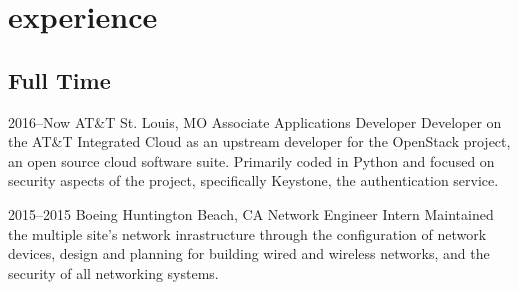 \documentclass[]{friggeri-cv} %
\begin{document}
 
 



 





\section{experience}
 
\subsection{Full Time}

\begin{entrylist}


\entry 
{2016--Now}
{AT\&T}
{St. Louis, MO}%
{Associate Applications Developer}
{
Developer on the AT\&T Integrated Cloud as an upstream developer for the OpenStack project, an open source cloud software suite. Primarily coded in Python and focused on security aspects of the project, specifically Keystone, the authentication service.
}

\entry 
{2015--2015}
{Boeing}
{Huntington Beach, CA}%
{Network Engineer Intern}
{
Maintained the multiple site's network inrastructure through the configuration of network devices, design and planning for building wired and wireless networks, and the security of all networking systems.
}


\end{entrylist}
\end{document}
